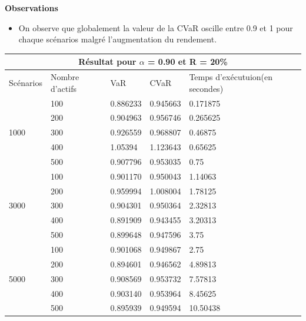 \documentclass[12pt]{article}
\theoremstyle{definition}
\theoremstyle{definition}
\begin{document}
\begin{center}
        \textbf{Observations}
\end{center}
\begin{itemize}
\item On observe que globalement la valeur de la CVaR oscille entre 0.9 et 1 pour chaque scénarios malgré l'augmentation du rendement.
\end{itemize}
\begin{tabular}{|l|l|l|l|l|}
  \hline
  \multicolumn{5}{|c|}{Résultat pour \textbf{$\alpha$ = 0.90} et \textbf{R = 20\%}} \\
  \hline
  Scénarios & Nombre d'actifs & VaR & CVaR & Temps d'exécutuion(en secondes)\\ \hline
  \multirow{5}{*}{1000} & 100 & 0.886233 & 0.945663 & 0.171875\\
    & 200 & 0.904963 & 0.956746 & 0.265625\\
    & 300 & 0.926559 & 0.968807 & 0.46875\\
    & 400 & 1.05394 & 1.123643 & 0.65625\\ 
    & 500 & 0.907796 & 0.953035 & 0.75\\ \hline
  \multirow{5}{*}{3000} & 100 & 0.901170 & 0.950043 & 1.14063\\
    & 200 & 0.959994 & 1.008004 & 1.78125\\
    & 300 & 0.904301 & 0.950364 & 2.32813\\
    & 400 & 0.891909 & 0.943455 & 3.20313\\ 
    & 500 & 0.899648 & 0.947596 & 3.75\\ \hline
  \multirow{5}{*}{5000} & 100 & 0.901068 & 0.949867 & 2.75\\
    & 200 & 0.894601 & 0.946562 & 4.89813\\
    & 300 & 0.908569 & 0.953732 & 7.57813\\
    & 400 & 0.903140 & 0.953964 & 8.45625\\ 
    & 500 & 0.895939 & 0.949594 & 10.50438\\ \hline
\end{tabular}
\end{document}
